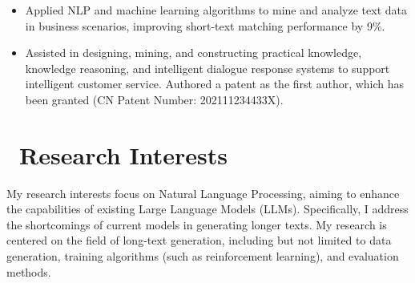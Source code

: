 \documentclass{resume}
\begin{document}
\begin{itemize}
    \item Applied NLP and machine learning algorithms to mine and analyze text data in business scenarios, improving short-text matching performance by 9\%.
    \item Assisted in designing, mining, and constructing practical knowledge, knowledge reasoning, and intelligent dialogue response systems to support intelligent customer service. Authored a patent as the first author, which has been granted (CN Patent Number: 202111234433X).
\end{itemize}

\section{\faInfo\ Research Interests}
My research interests focus on Natural Language Processing, aiming to enhance the capabilities of existing Large Language Models (LLMs). Specifically, I address the shortcomings of current models in generating longer texts. My research is centered on the field of long-text generation, including but not limited to data generation, training algorithms (such as reinforcement learning), and evaluation methods.
\end{document}
